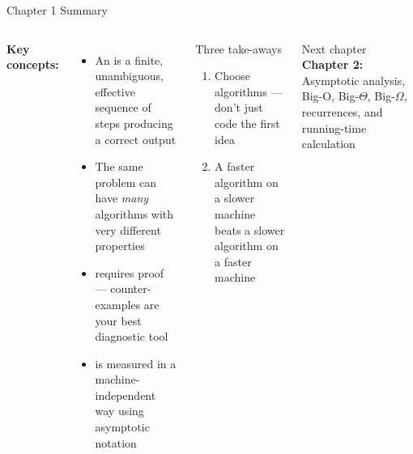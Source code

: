 \documentclass[aspectratio=169]{beamer}
\begin{document}
\begin{frame}[shrink=12]{Chapter 1 Summary}
  \begin{columns}[T]
      \textbf{Key concepts:}
      \begin{itemize}
        \item An  is a finite, unambiguous, effective
              sequence of steps producing a correct output
        \item The same problem can have \emph{many} algorithms with
              very different properties
        \item {} requires proof — counter-examples
              are your best diagnostic tool
        \item {} is measured in a machine-independent
              way using asymptotic notation
      \end{itemize}
      \begin{exampleblock}{Three take-aways}
        \begin{enumerate}
          \item Choose algorithms — don't just code the first idea
          \item A faster algorithm on a slower machine beats a
                slower algorithm on a faster machine
        \end{enumerate}
      \end{exampleblock}
      \vspace{0.4em}
      \begin{block}{Next chapter}
        \textbf{Chapter 2:} Asymptotic analysis, Big-O, Big-$\Theta$,
        Big-$\Omega$, recurrences, and running-time calculation
      \end{block}
  \end{columns}
\end{frame}
\end{document}
